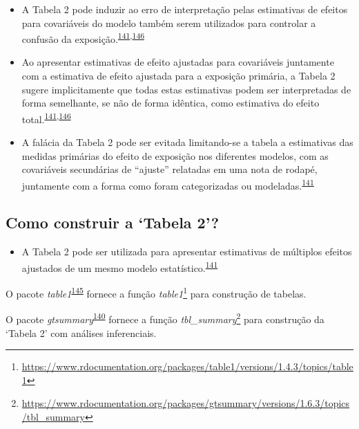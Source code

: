 \documentclass[
  a4paper,
]{book}
\providecommand{\tightlist}{%
  \setlength{\itemsep}{0pt}\setlength{\parskip}{0pt}}
\renewcommand{\href}[2]{#2\footnote{\url{#1}}}
\newenvironment{infobox}[1]
  {
  \begin{itemize}
  \renewcommand{\labelitemi}{
    \raisebox{-.7\height}[0pt][0pt]{
      {\setkeys{Gin}{width=3em,keepaspectratio}
        \texttt{[image: \#1]}}
    }
  }
  \setlength{\fboxsep}{1em}
  \begin{blackbox}
  \item
  }
  {
  \end{blackbox}
  \end{itemize}
  }
\begin{document}
\begin{itemize}
\item
  A Tabela 2 pode induzir ao erro de interpretação pelas estimativas de efeitos para covariáveis do modelo também serem utilizados para controlar a confusão da exposição.\textsuperscript{\protect\hyperlink{ref-Westreich2013}{141},\protect\hyperlink{ref-bandoli2018}{146}}
\item
  Ao apresentar estimativas de efeito ajustadas para covariáveis juntamente com a estimativa de efeito ajustada para a exposição primária, a Tabela 2 sugere implicitamente que todas estas estimativas podem ser interpretadas de forma semelhante, se não de forma idêntica, como estimativa do efeito total.\textsuperscript{\protect\hyperlink{ref-Westreich2013}{141},\protect\hyperlink{ref-bandoli2018}{146}}
\item
  A falácia da Tabela 2 pode ser evitada limitando-se a tabela a estimativas das medidas primárias do efeito de exposição nos diferentes modelos, com as covariáveis secundárias de ``ajuste'' relatadas em uma nota de rodapé, juntamente com a forma como foram categorizadas ou modeladas.\textsuperscript{\protect\hyperlink{ref-Westreich2013}{141}}
\end{itemize}

\hypertarget{como-construir-a-tabela-2}{%
\subsection{Como construir a `Tabela 2'?}\label{como-construir-a-tabela-2}}

\begin{itemize}
\tightlist
\item
  A Tabela 2 pode ser utilizada para apresentar estimativas de múltiplos efeitos ajustados de um mesmo modelo estatístico.\textsuperscript{\protect\hyperlink{ref-Westreich2013}{141}}
\end{itemize}

\begin{infobox}{images/Rlogo}
O pacote \emph{table1}\textsuperscript{\protect\hyperlink{ref-table1}{145}} fornece a função \href{https://www.rdocumentation.org/packages/table1/versions/1.4.3/topics/table1}{\emph{table1}} para construção de tabelas.

\end{infobox}

\begin{infobox}{images/Rlogo}
O pacote \emph{gtsummary}\textsuperscript{\protect\hyperlink{ref-gtsummary-2}{140}} fornece a função \href{https://www.rdocumentation.org/packages/gtsummary/versions/1.6.3/topics/tbl_summary}{\emph{tbl\_summary}} para construção da `Tabela 2' com análises inferenciais.

\end{infobox}
\end{document}
